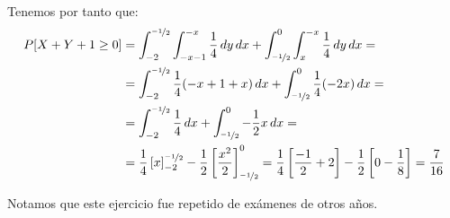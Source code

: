 \documentclass[12pt]{article}
\begin{document}
\begin{ejercicio}
\begin{enumerate}
            Tenemos por tanto que:
            \begin{align*}
                P[X + Y + 1 \geq 0] &= \int_{-2}^{\nicefrac{-1}{2}} \int_{-x-1}^{-x} \dfrac{1}{4} \, dy \, dx + \int_{\nicefrac{-1}{2}}^{0} \int_{x}^{-x} \dfrac{1}{4} \, dy \, dx
                =\\&= \int_{-2}^{\nicefrac{-1}{2}} \dfrac{1}{4}(-x+1+x) \, dx + \int_{\nicefrac{-1}{2}}^{0} \dfrac{1}{4}(-2x) \, dx
                =\\&= \int_{-2}^{\nicefrac{-1}{2}} \dfrac{1}{4} \, dx + \int_{\nicefrac{-1}{2}}^{0} -\dfrac{1}{2}x \, dx
                =\\&= \dfrac{1}{4}\left[x\right]_{-2}^{\nicefrac{-1}{2}} - \dfrac{1}{2}\left[\dfrac{x^2}{2}\right]_{\nicefrac{-1}{2}}^{0}
                = \dfrac{1}{4}\left[\dfrac{-1}{2}+2\right] - \dfrac{1}{2}\left[0 - \dfrac{1}{8}\right] = \dfrac{7}{16}
            \end{align*}
        \end{enumerate}
    \end{ejercicio}
    \begin{observacion}
        Notamos que este ejercicio fue repetido de exámenes de otros años.
    \end{observacion}
\end{document}
